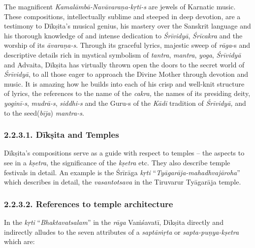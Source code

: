 The magnificent \textit{Kamalāmbā-Navāvaraṇa-kṛti-s} are jewels of Karnatic music. These compositions, intellectually sublime and steeped in deep devotion, are a testimony to Dīkṣita’s musical genius, his mastery over the Sanskrit language and his thorough knowledge of and intense dedication to \textit{Śrīvidyā}, \textit{Śrīcakra} and the worship of its \textit{āvaraṇa-s}. Through its graceful lyrics, majestic sweep of \textit{rāga}-s and descriptive details rich in mystical symbolism of \textit{tantra}, \textit{mantra}, \textit{yoga}, \textit{Śrīvidyā} and Advaita, Dīkṣita has virtually thrown open the doors to the secret world of \textit{Śrīvidyā}, to all those eager to approach the Divine Mother through devotion and music. It is amazing how he builds into each of his crisp and well-knit structure of lyrics, the references to the name of the \textit{cakra,} the names of its presiding deity, \textit{yoginī-s}, \textit{mudrā-s}, \textit{siddhi-s} and the Guru-s of the \textit{Kādi} tradition of \textit{Śrīvidyā,} and to the seed(\textit{bīja}) \textit{mantra-s}.


\subsubsection*{2.2.3.1. Dīkṣita and Temples}

Dīkṣita’s compositions serve as a guide with respect to temples – the aspects to see in a \textit{kṣetra}, the significance of the \textit{kṣetra} etc. They also describe temple festivals in detail. An example is the Śrīrāga\textit{ kṛti} “\textit{Tyāgarāja-mahadhvajāroha}” which describes in detail, the \textit{vasantotsava} in the Tiruvarur Tyāgarāja temple.


\subsubsection*{2.2.3.2. References to temple architecture}

In the \textit{kṛti} “\textit{Bhaktavatsalam}” in the \textit{rāga} Vaṁśavatī, Dīkṣita directly and indirectly alludes to the seven attributes of a \textit{saptāṁṛta} or \textit{sapta-puṇya-kṣetra} which are:

